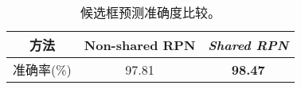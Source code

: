 \begin{table}[h]
	\centering
	\wuhao
	\begin{tabular}{ccc}
		\toprule[1pt]
		方法        & Non-shared RPN & \textit{Shared RPN}  \\ \midrule
		准确率(\%)  & 97.81      & \textbf{98.47}       \\
		\bottomrule[1pt]
	\end{tabular}
	\caption{候选框预测准确度比较。}
	\label{table:rpn_result}
\end{table}
